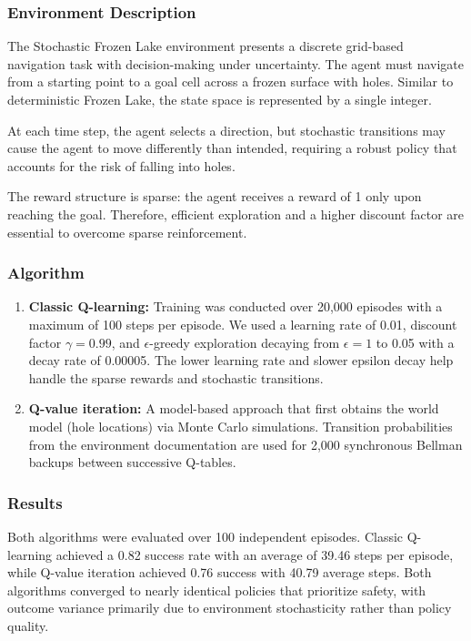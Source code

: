\documentclass[10pt]{article}
\begin{document}
\vspace{1em}

\subsubsection{Environment Description}
The Stochastic Frozen Lake environment presents a discrete grid-based navigation task with decision-making under uncertainty. The agent must navigate from a starting point to a goal cell across a frozen surface with holes. Similar to deterministic Frozen Lake, the state space is represented by a single integer.

At each time step, the agent selects a direction, but stochastic transitions may cause the agent to move differently than intended, requiring a robust policy that accounts for the risk of falling into holes.

The reward structure is sparse: the agent receives a reward of 1 only upon reaching the goal. Therefore, efficient exploration and a higher discount factor are essential to overcome sparse reinforcement.

\subsubsection{Algorithm}
\begin{enumerate}[label=\arabic*.,
    align=left,
    leftmargin=*,
    labelsep=0.2cm]
    \item \textbf{Classic Q-learning:} Training was conducted over 20,000 episodes with a maximum of 100 steps per episode. We used a learning rate of 0.01, discount factor $\gamma = 0.99$, and $\epsilon$-greedy exploration decaying from $\epsilon = 1$ to 0.05 with a decay rate of 0.00005. The lower learning rate and slower epsilon decay help handle the sparse rewards and stochastic transitions.
    \item \textbf{Q-value iteration:} A model-based approach that first obtains the world model (hole locations) via Monte Carlo simulations. Transition probabilities from the environment documentation are used for 2,000 synchronous Bellman backups between successive Q-tables.
\end{enumerate}

\subsubsection{Results}

Both algorithms were evaluated over 100 independent episodes. Classic Q-learning achieved a 0.82 success rate with an average of 39.46 steps per episode, while Q-value iteration achieved 0.76 success with 40.79 average steps. Both algorithms converged to nearly identical policies that prioritize safety, with outcome variance primarily due to environment stochasticity rather than policy quality.
\end{document}
